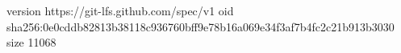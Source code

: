 version https://git-lfs.github.com/spec/v1
oid sha256:0e0cddb82813b38118c936760bff9e78b16a069e34f3af7b4fc2c21b913b3030
size 11068
